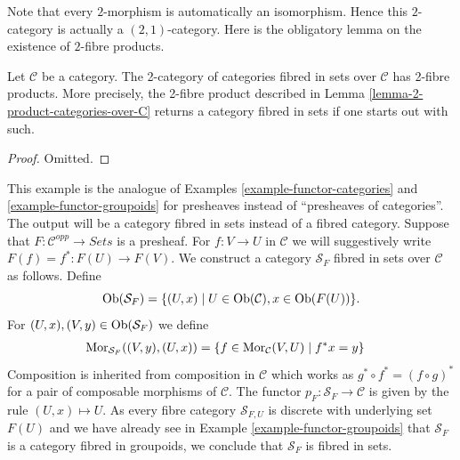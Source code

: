 \noindent
Note that every $2$-morphism is automatically an isomorphism.
Hence this $2$-category is actually a $(2, 1)$-category.
Here is the obligatory lemma on the existence of $2$-fibre products.

\begin{lemma}
\label{lemma-2-product-categories-fibred-sets}
Let $\mathcal{C}$ be a category.
The 2-category of categories fibred in sets over $\mathcal{C}$
has 2-fibre products. More precisely, the 2-fibre product described in
Lemma \ref{lemma-2-product-categories-over-C}
returns a category fibred in sets if one starts out with such.
\end{lemma}

\begin{proof}
Omitted.
\end{proof}

\begin{example}
\label{example-presheaf}
This example is the analogue of
Examples \ref{example-functor-categories} and
\ref{example-functor-groupoids}
for presheaves instead of ``presheaves of categories''.
The output will be a category fibred in sets instead of a fibred category.
Suppose that $F : \mathcal{C}^{opp} \to \textit{Sets}$ is a presheaf.
For $f : V \to U$ in $\mathcal{C}$ we will
suggestively write $F(f) = f^\ast : F(U) \to F(V)$.
We construct a category $\mathcal{S}_F$ fibred in sets over $\mathcal{C}$
as follows. Define
$$
\mathop{\mathrm{Ob}}\nolimits(\mathcal{S}_F) =
\{(U, x) \mid U \in \mathop{\mathrm{Ob}}\nolimits(\mathcal{C}), x \in \mathop{\mathrm{Ob}}\nolimits(F(U))\}.
$$
For $(U, x), (V, y) \in \mathop{\mathrm{Ob}}\nolimits(\mathcal{S}_F)$ we define
\begin{align*}
\mathop{\mathrm{Mor}}\nolimits_{\mathcal{S}_F}((V, y), (U, x))
& =
\{f \in \mathop{\mathrm{Mor}}\nolimits_\mathcal{C}(V, U) \mid f^*x = y\}
\end{align*}
Composition is inherited from composition in $\mathcal{C}$
which works as $g^\ast \circ f^\ast = (f \circ g)^\ast$
for a pair of composable morphisms of $\mathcal{C}$.
The functor $p_F : \mathcal{S}_F \to \mathcal{C}$
is given by the rule $(U, x) \mapsto U$.
As every fibre category $\mathcal{S}_{F, U}$ is discrete with underlying
set $F(U)$ and we have already see in
Example \ref{example-functor-groupoids}
that $\mathcal{S}_F$ is a category fibred in groupoids,
we conclude that $\mathcal{S}_F$ is fibred in sets.
\end{example}

